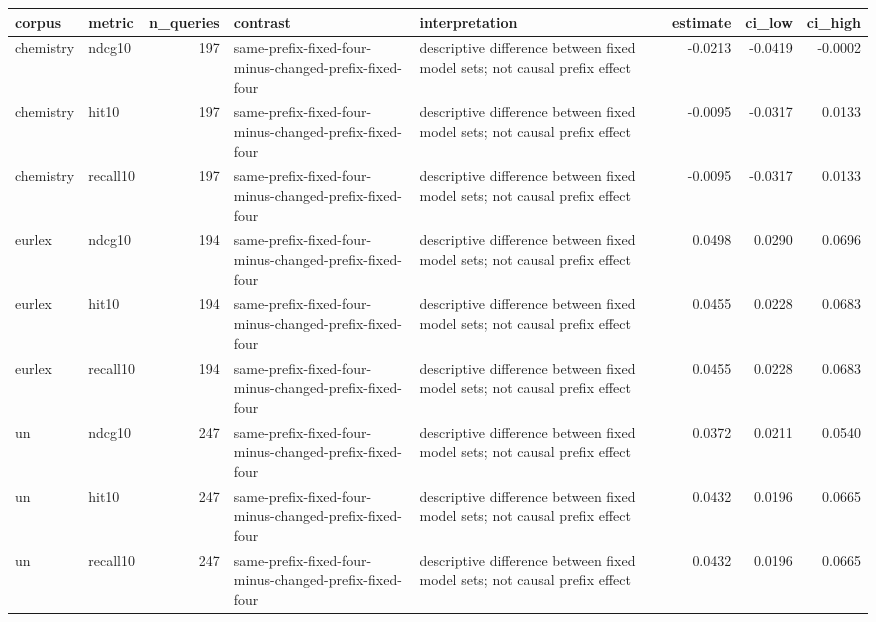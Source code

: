 \begin{tabular}{llrllrrr}
\toprule
corpus & metric & n\_queries & contrast & interpretation & estimate & ci\_low & ci\_high \\
\midrule
chemistry & ndcg10 & 197 & same-prefix-fixed-four-minus-changed-prefix-fixed-four & descriptive difference between fixed model sets; not causal prefix effect & -0.0213 & -0.0419 & -0.0002 \\
chemistry & hit10 & 197 & same-prefix-fixed-four-minus-changed-prefix-fixed-four & descriptive difference between fixed model sets; not causal prefix effect & -0.0095 & -0.0317 & 0.0133 \\
chemistry & recall10 & 197 & same-prefix-fixed-four-minus-changed-prefix-fixed-four & descriptive difference between fixed model sets; not causal prefix effect & -0.0095 & -0.0317 & 0.0133 \\
eurlex & ndcg10 & 194 & same-prefix-fixed-four-minus-changed-prefix-fixed-four & descriptive difference between fixed model sets; not causal prefix effect & 0.0498 & 0.0290 & 0.0696 \\
eurlex & hit10 & 194 & same-prefix-fixed-four-minus-changed-prefix-fixed-four & descriptive difference between fixed model sets; not causal prefix effect & 0.0455 & 0.0228 & 0.0683 \\
eurlex & recall10 & 194 & same-prefix-fixed-four-minus-changed-prefix-fixed-four & descriptive difference between fixed model sets; not causal prefix effect & 0.0455 & 0.0228 & 0.0683 \\
un & ndcg10 & 247 & same-prefix-fixed-four-minus-changed-prefix-fixed-four & descriptive difference between fixed model sets; not causal prefix effect & 0.0372 & 0.0211 & 0.0540 \\
un & hit10 & 247 & same-prefix-fixed-four-minus-changed-prefix-fixed-four & descriptive difference between fixed model sets; not causal prefix effect & 0.0432 & 0.0196 & 0.0665 \\
un & recall10 & 247 & same-prefix-fixed-four-minus-changed-prefix-fixed-four & descriptive difference between fixed model sets; not causal prefix effect & 0.0432 & 0.0196 & 0.0665 \\
\bottomrule
\end{tabular}
